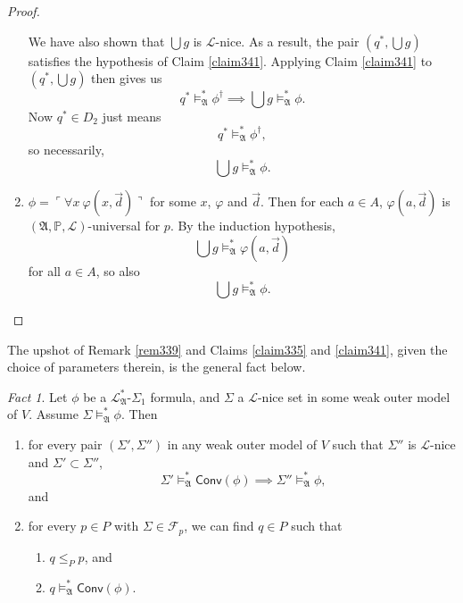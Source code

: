 \documentclass[12pt, twoside]{memoir}
\numberwithin{equation}{section}
\theoremstyle{definition}
\theoremstyle{remark}
\newtheorem{fact}[thm]{Fact}
\theoremstyle{definition}
\theoremstyle{definition}
\theoremstyle{definition}
\theoremstyle{remark}
\begin{document}
\begin{proof}
\begin{enumerate}[label=Case \arabic*:, leftmargin=50pt]
    We have also shown that $\bigcup g$ is $\mathcal{L}$-nice. As a result, the pair $(q^*, \bigcup g)$ satisfies the hypothesis of Claim \ref{claim341}. Applying Claim \ref{claim341} to $(q^*, \bigcup g)$ then gives us
    \begin{equation*}
        q^* \models^{*}_{\mathfrak{A}} \phi^{\dagger} \implies \bigcup g \models^{*}_{\mathfrak{A}} \phi \text{.}
    \end{equation*}
    Now $q^* \in D_2$ just means $$q^* \models^{*}_{\mathfrak{A}} \phi^{\dagger},$$ so necessarily, 
    \begin{equation*}
        \bigcup g \models^{*}_{\mathfrak{A}} \phi \text{.}
    \end{equation*}
    
    \item\label{526c3} $\phi = \ulcorner \forall x \ \varphi(x, \Vec{d}) \urcorner$ for some $x$, $\varphi$ and $\Vec{d}$. Then for each $a \in A$, $\varphi(a, \Vec{d})$ is $(\mathfrak{A}, \mathbb{P}, \mathcal{L})$-universal for $p$. By the induction hypothesis, $$\bigcup g \models^{*}_{\mathfrak{A}} \varphi(a, \Vec{d})$$ for all $a \in A$, so also $$\bigcup g \models^{*}_{\mathfrak{A}} \phi.$$ \qedhere
\end{enumerate}
\end{proof}

The upshot of Remark \ref{rem339} and Claims \ref{claim335} and \ref{claim341}, given the choice of parameters therein, is the general fact below. 

\begin{fact}\label{fact336}
Let $\phi$ be a $\mathcal{L}^{*}_{\mathfrak{A}}$-$\Sigma_1$ formula, and $\Sigma$ a $\mathcal{L}$-nice set in some weak outer model of $V$.
Assume $\Sigma \models^{*}_{\mathfrak{A}} \phi$. Then
\begin{enumerate}[label=(\arabic*)]
    \item\label{3363} for every pair $(\Sigma', \Sigma'')$ in any weak outer model of $V$ such that $\Sigma''$ is $\mathcal{L}$-nice and $\Sigma' \subset \Sigma''$,
    \begin{equation*}
        \Sigma' \models^{*}_{\mathfrak{A}} \mathsf{Conv}(\phi) \implies \Sigma'' \models^{*}_{\mathfrak{A}} \phi \text{,}
    \end{equation*}
    and
    \item\label{3361} for every $p \in P$ with $\Sigma \in \mathcal{F}_p$, we can find $q \in P$ such that
    \begin{enumerate}[label=(\alph*)]
        \item $q \leq_P p$, and
        \item\label{3362} $q \models^{*}_{\mathfrak{A}} \mathsf{Conv}(\phi)$. 
    \end{enumerate}
\end{enumerate}
\end{fact}
\end{document}
